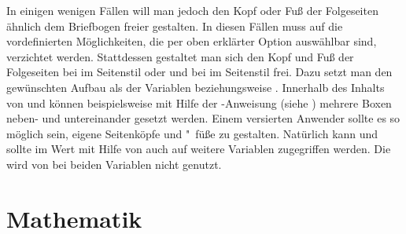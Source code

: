 \begin{Declaration}
\end{Declaration}
In einigen wenigen Fällen will man jedoch den Kopf oder Fuß der Folgeseiten
ähnlich dem Briefbogen freier gestalten. In diesen Fällen
muss auf die vordefinierten Möglichkeiten, die per oben erklärter Option
 auswählbar
sind, verzichtet werden. Stattdessen gestaltet man sich den Kopf und Fuß der
Folgeseiten bei  im Seitenstil
%
 oder
 und bei
 im Seitenstil
%
frei. Dazu setzt man den gewünschten Aufbau als  der
Variablen 
beziehungsweise . Innerhalb des Inhalts von
 und  können beispielsweise mit Hilfe
der -Anweisung (siehe \cite{latex:usrguide}) mehrere Boxen
neben- und untereinander gesetzt werden.  Einem versierten Anwender sollte es
so möglich sein, eigene Seitenköpfe und "~füße zu gestalten. Natürlich kann
und sollte im Wert mit Hilfe von  auch auf
weitere Variablen zugegriffen werden. Die  wird von
\KOMAScript{} bei beiden Variablen nicht genutzt.%
\EndIndexGroup
\EndIndexGroup
%
\EndIndexGroup






\section{Mathematik}
%
\BeginIndexGroup
{}%
%
%

